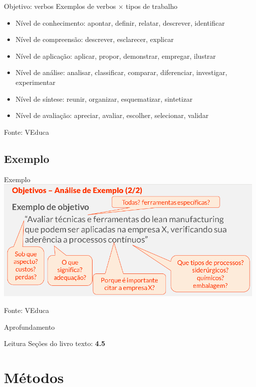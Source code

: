 \documentclass{beamer}
\begin{document}
\begin{frame}{Objetivo: verbos}
  Exemplos de verbos $\times$ tipos de trabalho
  \begin{itemize}
  \item Nível de conhecimento: apontar, definir, relatar, descrever,
    identificar
  \item Nível de compreensão: descrever, esclarecer, explicar
  \item Nível de aplicação: aplicar, propor, demonstrar, empregar, ilustrar
  \item Nível de análise: analisar, classificar, comparar,
    diferenciar, investigar, experimentar
  \item Nível de síntese: reunir, organizar, esquematizar, sintetizar
  \item Nível de avaliação: apreciar, avaliar, escolher, selecionar, validar
  \end{itemize}

  Fonte: VEduca
\end{frame}

\subsection{Exemplo}

\begin{frame}{Exemplo}
  \includegraphics[width=1.15\textwidth]{ProjetoI/objetivo-verbos}

  Fonte: VEduca
\end{frame}

\begin{frame}{Aprofundamento}
  \begin{block}{Leitura}
    Seções do livro texto: {\bf 4.5}
  \end{block}
\end{frame}

\section{Métodos}
\end{document}
